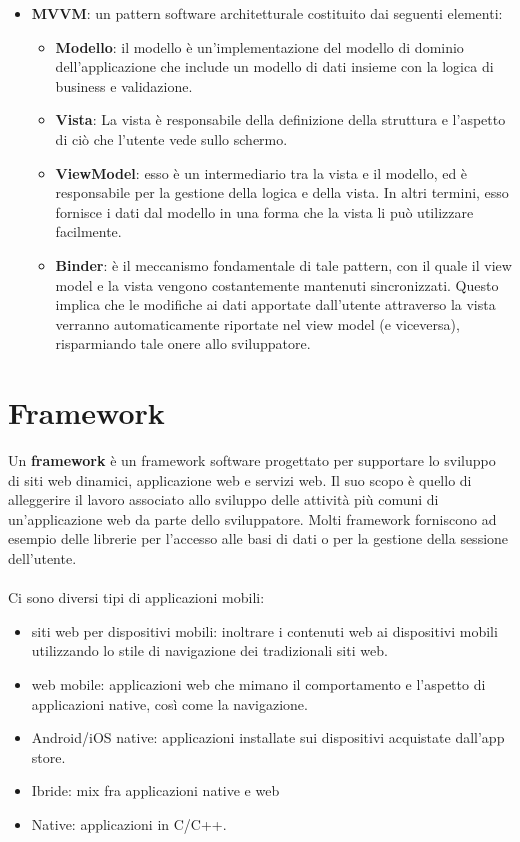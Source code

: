 \begin{itemize}
    \item \textbf{MVVM}: un pattern software architetturale costituito dai seguenti elementi:
          \begin{itemize}
              \item \textbf{Modello}: il modello è un'implementazione del modello di dominio dell'applicazione che include un modello di dati insieme con la logica di business e validazione.
              \item \textbf{Vista}: La vista è responsabile della definizione della struttura e l'aspetto di ciò che l'utente vede sullo schermo.
              \item \textbf{ViewModel}: esso è un intermediario tra la vista e il modello, ed è responsabile per la gestione della logica e della vista. In altri termini, esso fornisce i dati dal modello in una forma che la vista li può utilizzare facilmente.
              \item \textbf{Binder}: è il meccanismo fondamentale di tale pattern, con il quale il view model e la vista vengono costantemente mantenuti sincronizzati. Questo implica che le modifiche ai dati apportate dall'utente attraverso la vista verranno automaticamente riportate nel view model (e viceversa), risparmiando tale onere allo sviluppatore.
          \end{itemize}
\end{itemize}

\section{Framework}
Un \textbf{framework} è un framework software progettato per supportare lo sviluppo di siti web dinamici, applicazione web e servizi web. Il suo scopo è quello di alleggerire il lavoro associato allo sviluppo delle attività più comuni di un'applicazione web da parte dello sviluppatore. Molti framework forniscono ad esempio delle librerie per l'accesso alle basi di dati o per la gestione della sessione dell'utente.\\\\Ci sono diversi tipi di applicazioni mobili:
\begin{itemize}
    \item siti web per dispositivi mobili: inoltrare i contenuti web ai dispositivi mobili utilizzando lo stile di navigazione dei tradizionali siti web.
    \item web mobile: applicazioni web che mimano il comportamento e l'aspetto di applicazioni native, così come la navigazione.
    \item Android/iOS native: applicazioni installate sui dispositivi acquistate dall'app store.
    \item Ibride: mix fra applicazioni native e web
    \item Native: applicazioni in C/C++.
\end{itemize}

